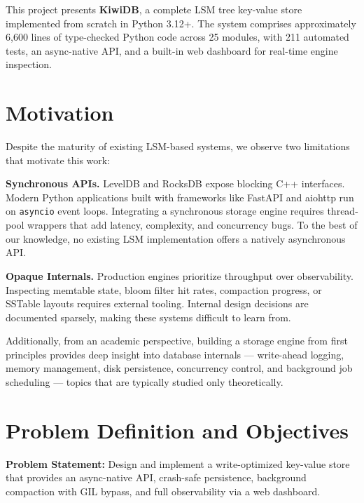 \documentclass[oneside,a4paper,12pt]{book}
\begin{document}
This project presents \textbf{KiwiDB}, a complete LSM tree key-value store implemented from scratch in Python 3.12+. The system comprises approximately 6,600 lines of type-checked Python code across 25 modules, with 211 automated tests, an async-native API, and a built-in web dashboard for real-time engine inspection.

\section{Motivation}

Despite the maturity of existing LSM-based systems, we observe two limitations that motivate this work:

\textbf{Synchronous APIs.} LevelDB and RocksDB \cite{c8} expose blocking C++ interfaces. Modern Python applications built with frameworks like FastAPI and aiohttp run on \texttt{asyncio} event loops. Integrating a synchronous storage engine requires thread-pool wrappers that add latency, complexity, and concurrency bugs. To the best of our knowledge, no existing LSM implementation offers a natively asynchronous API.

\textbf{Opaque Internals.} Production engines prioritize throughput over observability. Inspecting memtable state, bloom filter hit rates, compaction progress, or SSTable layouts requires external tooling. Internal design decisions are documented sparsely, making these systems difficult to learn from.

Additionally, from an academic perspective, building a storage engine from first principles provides deep insight into database internals --- write-ahead logging, memory management, disk persistence, concurrency control, and background job scheduling --- topics that are typically studied only theoretically.

\section{Problem Definition and Objectives}

\textbf{Problem Statement:} Design and implement a write-optimized key-value store that provides an async-native API, crash-safe persistence, background compaction with GIL bypass, and full observability via a web dashboard.
\end{document}
